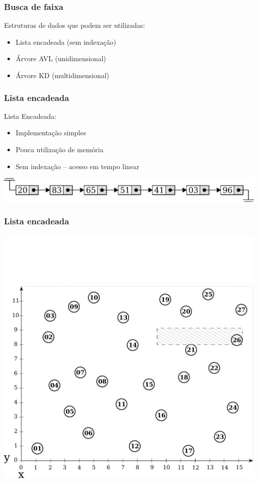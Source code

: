 \documentclass[10pt,xcolor=table,fleqn]{beamer}
\newcommand{\badpt}{{\color{defred} \DOWNarrow }}
\newcommand{\goodpt}{{\color{defgreen} \UParrow }}
\begin{document}
\begin{frame}
  \frametitle{Busca de faixa}
  Estruturas de dados que podem ser utilizadas:
  \vspace{1em}
  \begin{itemize}
    \setlength\itemsep{1em}
    \item{ Lista encadeada (sem indexação)}
    \item{ Árvore AVL (unidimensional)}
    \item{ Árvore KD (multidimensional)}
  \end{itemize}
\end{frame}

\begin{frame}
  \frametitle{Lista encadeada}
  Lista Encadeada:\\
  \vspace{1em}
  \begin{itemize}
    \setlength\itemsep{1em}
    \item{ Implementação simples \goodpt }
    \item{ Pouca utilização de memória \goodpt }
    \item{ Sem indexação -- acesso em tempo linear \badpt }
  \end{itemize}
  \begin{center}
    \includegraphics[scale=0.4]{../img/kdt/lst-model}
  \end{center}
\end{frame}

\begin{frame}
  \frametitle{Lista encadeada}
  \begin{center}
    \includegraphics[scale=0.3]{../img/points-query/lst/points}
  \end{center}
\end{frame}
\end{document}
